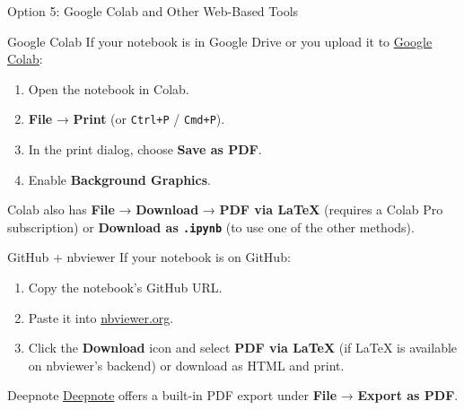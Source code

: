 \documentclass[
  ignorenonframetext,
  aspectratio=169,
]{beamer}
\providecommand{\tightlist}{%
  \setlength{\itemsep}{0pt}\setlength{\parskip}{0pt}}
\begin{document}
\begin{frame}[fragile]{Option 5: Google Colab and Other Web-Based Tools}
\protect{}\label{option-5-google-colab-and-other-web-based-tools}
\begin{block}{Google Colab}
\protect{}\label{google-colab}
If your notebook is in Google Drive or you upload it to
\href{https://colab.research.google.com/}{Google Colab}:

\begin{enumerate}
\tightlist
\item
  Open the notebook in Colab.
\item
  \textbf{File} → \textbf{Print} (or \texttt{Ctrl+P} / \texttt{Cmd+P}).
\item
  In the print dialog, choose \textbf{Save as PDF}.
\item
  Enable \textbf{Background Graphics}.
\end{enumerate}

Colab also has \textbf{File} → \textbf{Download} → \textbf{PDF via
LaTeX} (requires a Colab Pro subscription) or \textbf{Download as
\texttt{.ipynb}} (to use one of the other methods).
\end{block}

\begin{block}{GitHub + nbviewer}
\protect{}\label{github-nbviewer}
If your notebook is on GitHub:

\begin{enumerate}
\tightlist
\item
  Copy the notebook's GitHub URL.
\item
  Paste it into \href{https://nbviewer.org}{nbviewer.org}.
\item
  Click the \textbf{Download} icon and select \textbf{PDF via LaTeX} (if
  LaTeX is available on nbviewer's backend) or download as HTML and
  print.
\end{enumerate}
\end{block}

\begin{block}{Deepnote}
\protect{}\label{deepnote}
\href{https://deepnote.com}{Deepnote} offers a built-in PDF export under
\textbf{File} → \textbf{Export as PDF}.
\end{block}
\end{frame}
\end{document}
